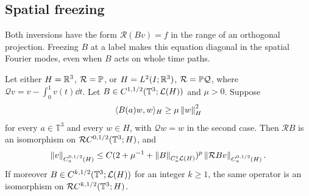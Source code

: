 \subsection{Spatial freezing}
Both inversions have the form $\mathcal R(Bv)=f$ in the range of an
orthogonal projection. Freezing $B$ at a label makes this equation
diagonal in the spatial Fourier modes, even when $B$ acts on whole
time paths.
\begin{lemma}\label{cc:holder:freezing}
Let either $H=\mathbb R^3$, $\mathcal R=\mathbb P$, or
$H=L^2(I;\mathbb R^3)$, $\mathcal R=\mathbb P\mathcal Q$, where
$\mathcal Qv=v-\int_0^1v(t)\dd t$.
Let $B\in C^{1,1/2}(\mathbb T^3;\mathcal L(H))$ and $\mu>0$. Suppose
\begin{equation}\label{cc:holder:eq:abstract-coercive}
 \langle B(a)w,w\rangle_H\ge\mu\left\lVert w\right\rVert_H^2
\end{equation}
for every $a\in\mathbb T^3$ and every $w\in H$, with
$\mathcal Qw=w$ in the second case.
Then $\mathcal RB$ is an isomorphism on $\mathcal RC^{0,1/2}(\mathbb T^3;H)$, and
\begin{equation}\label{cc:holder:eq:freezing}
 \left\lVert v\right\rVert_{C^{0,1/2}_a(H)}
 \le C(2+\mu^{-1}+\left\lVert B\right\rVert_{C^1_a\mathcal L(H)})^{p}
            \left\lVert\mathcal RBv\right\rVert_{C^{0,1/2}_a(H)}.
\end{equation}
If moreover $B\in C^{k,1/2}(\mathbb T^3;\mathcal L(H))$ for an
integer $k\ge1$, the same operator is an isomorphism on
$\mathcal RC^{k,1/2}(\mathbb T^3;H)$.
\end{lemma}

